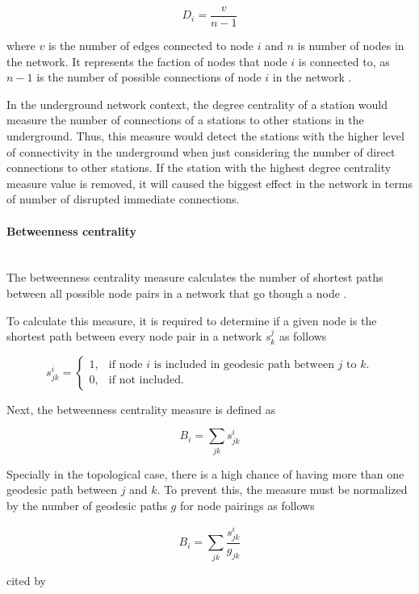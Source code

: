 \documentclass{article}
\begin{document}
\[D_{i} = \frac{v}{n-1}\]

where $v$ is the number of edges connected to node $i$ and $n$ is number of nodes in the network. It represents the faction of nodes that node $i$ is connected to, as $n-1$ is the number of possible connections of node $i$ in the network \citep{hagbergExploringNetworkStructure2008}.

In the underground network context, the degree centrality of a station would measure the number of connections of a stations to other stations in the underground. Thus, this measure would detect the stations with the higher level of connectivity in the underground when just considering the number of direct connections to other stations. If the station with the highest degree centrality measure value is removed, it will caused the biggest effect in the network in terms of number of disrupted immediate connections.


\paragraph{Betweenness centrality}\mbox{}\\

The betweenness centrality measure calculates the number of shortest paths between all possible node pairs in a network that go though a node \citep{arcauteNetworksUrbanSimulation2023}.

To calculate this measure, it is required to determine if a given node is the shortest path between every node pair in a network $s^{j}_{k}$ as follows


\[s^{i}_{jk}=\begin{cases}
1, & \text{if node $i$ is included in geodesic path between $j$ to $k$}.\\
0, & \text{if not included}.
  \end{cases}
\]

Next, the betweenness centrality measure is defined as 

\[B_{i}=\sum_{jk} s^{i}_{jk}\]

Specially in the topological case, there is a high chance of having more than one geodesic path between $j$ and $k$. To prevent this, the measure must be normalized by the number of geodesic paths $g$ for node pairings as follows

\[B_{i}=\sum_{jk} \frac {s^{i}_{jk}}{g_{jk}}\]



\citep{newmanNetworks2018} cited by \citep{marinReviewCentralityMeasures2022}
\end{document}
